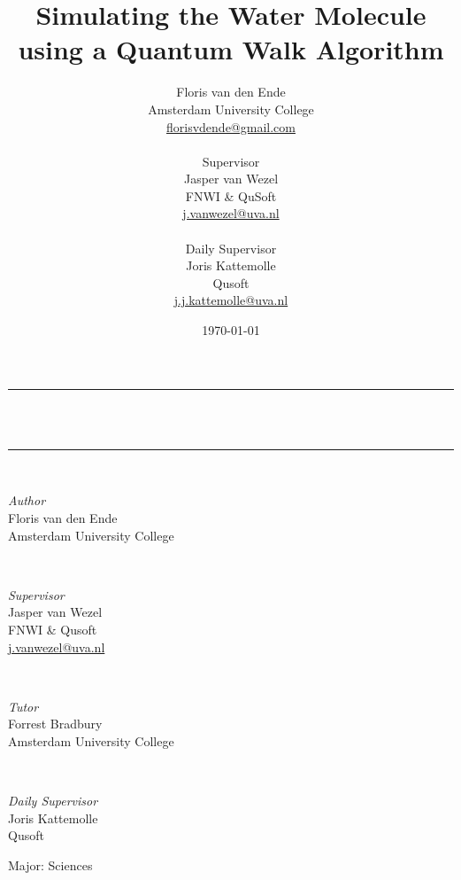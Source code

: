 \documentclass{article}
\date{\today}
\title{Simulating the Water Molecule using a Quantum Walk Algorithm}
\author{
    Floris van den Ende\\
    \small{Amsterdam University College}\\
    \small{\url{florisvdende@gmail.com}}\\
    \\
    \small{Supervisor}\\
    Jasper van Wezel\\
    \small{FNWI \& QuSoft}\\
    \small{\url{j.vanwezel@uva.nl}}\\ \\
    \small{Daily Supervisor}\\
    Joris Kattemolle\\
    \small{Qusoft}\\
    \small{\url{j.j.kattemolle@uva.nl}}
}
\begin{document}
\begin{titlepage}
    \newcommand{\HRule}{\rule{\linewidth}{0.5mm}}

	\center

	\HRule\\[0.4cm]

	{\huge\bfseries \thetitle\\[0.4cm]}

	\HRule\\[1.5cm]

	\begin{minipage}{0.45\textwidth}
		\begin{flushleft}
			\large
			\textit{Author}\\
            Floris van den Ende\\
            {\small Amsterdam University College}\\
            {\small{}}
		\end{flushleft}
	\end{minipage}
	~
	\begin{minipage}{0.4\textwidth}
		\begin{flushright}
			\large
			\textit{Supervisor}\\
            Jasper van Wezel\\
            {\small{FNWI \& Qusoft}\\
            {\small{\url{j.vanwezel@uva.nl}}}}
		\end{flushright}
    \end{minipage}
    \\[1cm]
    \begin{minipage}[t]{0.45\textwidth}
		\begin{flushleft}
			\large
			\textit{Tutor}\\
            Forrest Bradbury\\
            {\small Amsterdam University College}\\
            {\small{}}
		\end{flushleft}
	\end{minipage}
	~
	\begin{minipage}[t]{0.4\textwidth}
		\begin{flushright}
			\large
			\textit{Daily Supervisor}\\
            Joris Kattemolle\\
            {\small Qusoft}\\
            {\small{}}
		\end{flushright}
	\end{minipage}
    \vfill\vfill\vfill

    {\large
        Major: Sciences\\[0.5cm]
        \thedate
          
           }

	\vfill

\end{titlepage}
\end{document}
